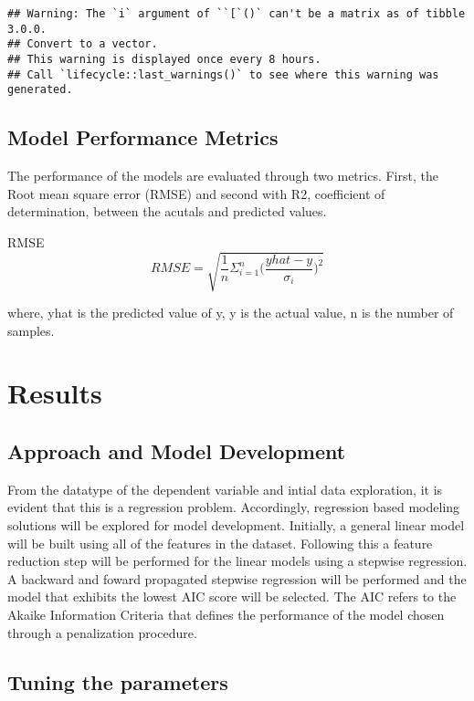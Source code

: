 \documentclass[11pt,]{article}
\begin{document}
\begin{verbatim}
## Warning: The `i` argument of ``[`()` can't be a matrix as of tibble 3.0.0.
## Convert to a vector.
## This warning is displayed once every 8 hours.
## Call `lifecycle::last_warnings()` to see where this warning was generated.
\end{verbatim}

\hypertarget{model-performance-metrics}{%
\subsection{Model Performance Metrics}\label{model-performance-metrics}}

The performance of the models are evaluated through two metrics. First,
the Root mean square error (RMSE) and second with R2, coefficient of
determination, between the acutals and predicted values.

RMSE
\[ RMSE = \sqrt{\frac{1}{n}\Sigma_{i=1}^{n}{\Big(\frac{yhat -y}{\sigma_i}\Big)^2}} \]

where, yhat is the predicted value of y, y is the actual value, n is the
number of samples.

\hypertarget{results}{%
\section{Results}\label{results}}

\hypertarget{approach-and-model-development}{%
\subsection{Approach and Model
Development}\label{approach-and-model-development}}

From the datatype of the dependent variable and intial data exploration,
it is evident that this is a regression problem. Accordingly, regression
based modeling solutions will be explored for model development.
Initially, a general linear model will be built using all of the
features in the dataset. Following this a feature reduction step will be
performed for the linear models using a stepwise regression. A backward
and foward propagated stepwise regression will be performed and the
model that exhibits the lowest AIC score will be selected. The AIC
refers to the Akaike Information Criteria that defines the performance
of the model chosen through a penalization procedure.

\hypertarget{tuning-the-parameters}{%
\subsection{Tuning the parameters}\label{tuning-the-parameters}}
\end{document}
